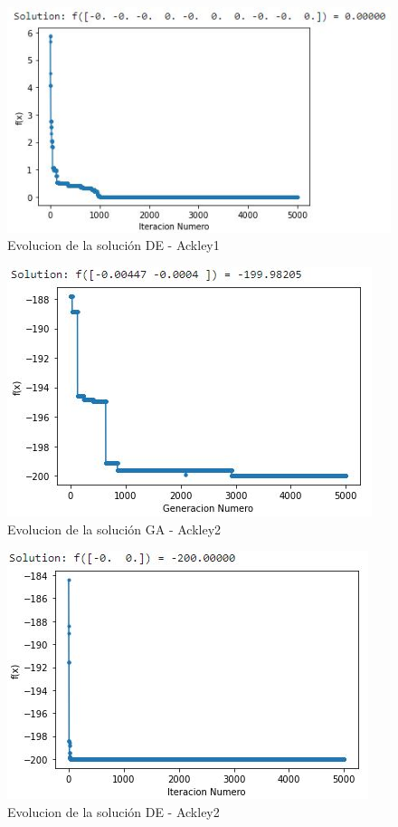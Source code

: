\documentclass[10pt]{article}
\begin{document}
\begin{figure}[H]
\centerline{\includegraphics{ack-1-de.jpg}}
\caption{Evolucion de la solución DE - Ackley1}
\label{fig_1}
\end{figure}

\begin{figure}[H]
\centerline{\includegraphics{ack-2-ga.jpg}}
\caption{Evolucion de la solución GA - Ackley2}
\label{fig_1}
\end{figure}

\begin{figure}[H]
\centerline{\includegraphics{ack-2-de.jpg}}
\caption{Evolucion de la solución DE - Ackley2}
\label{fig_1}
\end{figure}
\end{document}
